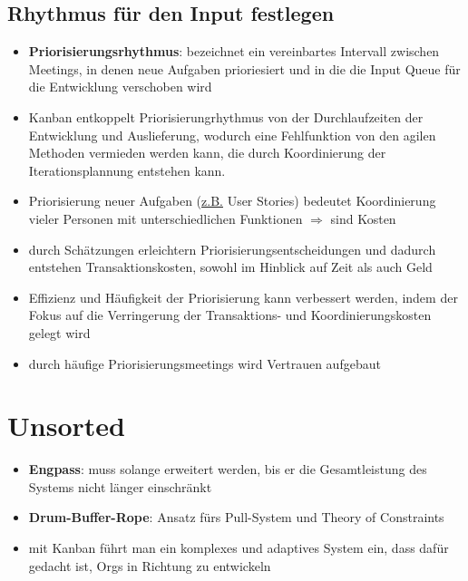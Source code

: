 \subsection{Rhythmus für den Input festlegen}
\begin{itemize}
  \item \textbf{Priorisierungsrhythmus}: bezeichnet ein vereinbartes Intervall zwischen Meetings, in
    denen neue Aufgaben prioriesiert und in die die Input Queue für die Entwicklung verschoben wird
  \item  Kanban entkoppelt Priorisierungrhythmus von der Durchlaufzeiten der Entwicklung und
    Auslieferung, wodurch eine Fehlfunktion von den agilen Methoden vermieden werden kann, die durch
    Koordinierung der Iterationsplannung entstehen kann.
  \item Priorisierung neuer Aufgaben (\uline{z.B.} User Stories) bedeutet Koordinierung vieler
    Personen mit unterschiedlichen Funktionen $\Rightarrow$ sind Kosten
  \item durch Schätzungen erleichtern Priorisierungsentscheidungen und dadurch entstehen
    Transaktionskosten, sowohl im Hinblick auf Zeit als auch Geld
  \item Effizienz und Häufigkeit der Priorisierung kann verbessert werden, indem der Fokus auf die
    Verringerung der Transaktions- und Koordinierungskosten gelegt wird
  \item durch häufige Priorisierungsmeetings wird Vertrauen aufgebaut
\end{itemize}


\section{Unsorted}
\begin{itemize}
  \item \textbf{Engpass}: muss solange erweitert werden, bis er die Gesamtleistung des Systems nicht
    länger einschränkt
  \item \textbf{Drum-Buffer-Rope}: Ansatz fürs Pull-System und Theory of Constraints
  \item mit Kanban führt man ein komplexes und adaptives System ein, dass dafür gedacht ist, Orgs in
    Richtung  zu entwickeln
\end{itemize}




